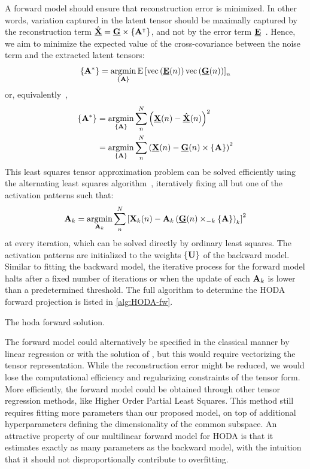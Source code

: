 \documentclass[10pt]{iopart}
\begin{document}
A forward model should ensure that reconstruction error is minimized.
In other words, variation captured in the latent tensor should be maximally captured by the
reconstruction term $\hat{\ten{X}}= \ten{G}\mmpr{\mat{A}^\intercal}$, and not by the error term
$\ten{E}$~\cite{Haufe2014}.
Hence, we aim to minimize the expected value of the cross-covariance between
the noise term and the extracted latent tensors:
\begin{equation}
	\left\{\mat{A}^*\right\}
  = \argmin_{\{\mat{A}\}}\text{E}\left[
      \text{vec}\left(\ten{E}(n)\right)\text{vec}\left(\ten{G}(n)\right)
    \right]_n
\end{equation}
or, equivalently~\cite{Parra2005,Haufe2014},
\begin{eqnarray}
	\left\{\mat{A}^*\right\}
   & = \argmin_{\{\mat{A}\}}\sum_n^N\left(\ten{X}(n) -
   \hat{\ten{X}}(n)\right)^2 \\
   & = \argmin_{\{\mat{A}\}}\sum_n^N\left(\ten{X}(n) - \ten{G}(n)\mmpr{\mat{A}}\right)^2
\end{eqnarray}
This least squares tensor approximation problem can be solved efficiently using the
alternating least squares algorithm~\cite{Bentbib2022}, iteratively fixing all but one of the activation patterns such that:
\begin{equation}
	\mat{A}_k = \argmin_{\mat{A}_k}
	\sum_n^N\left[\mat{X}_k(n) -
		\mat{A}_k\left(\ten{G}(n)\mmprs{\mat{A}}{k}\right)_k\right]^2
\end{equation}
at every iteration, which can be solved directly by ordinary least squares.
The activation patterns are initialized to the weights $\{\mat{U}\}$ of the
backward model.
Similar to fitting the backward model, the iterative process for the forward
model halts after a fixed number of iterations or when the update of each
$\mat{A}_k$ is lower than a predetermined threshold.
The full algorithm to determine the HODA forward projection is listed
in \cref{alg:HODA-fw}.
\begin{algorithm}
  \caption[A \acs{hoda} forward solution.]{The \acs{hoda} forward solution.}
	\label{alg:HODA-fw}
	
\end{algorithm}

The forward model could alternatively be specified in the classical manner by linear
regression or with the solution of \textcite{Haufe2014}, but this would require
vectorizing the tensor representation.
While the reconstruction error might be reduced, we would lose the computational
efficiency and regularizing constraints of the tensor form.
More efficiently, the forward model could be obtained through other tensor
regression methods, like Higher Order Partial
Least Squares.
This method still requires fitting more parameters than our
proposed model, on top of additional hyperparameters defining the
dimensionality of the common subspace.
An attractive property of our multilinear forward model for HODA is that it
estimates exactly as many parameters as the backward model, with the intuition that
it should not disproportionally contribute to overfitting.
\end{document}
